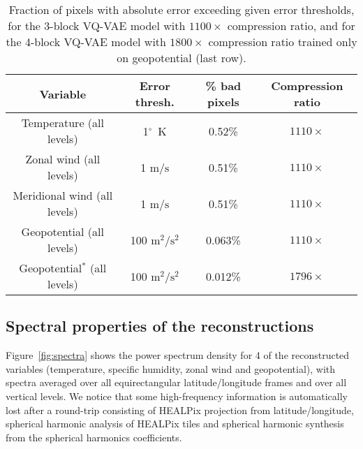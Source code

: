 \begin{table}[]
    \centering
    \caption{Fraction of pixels with absolute error exceeding given error thresholds, for the 3-block VQ-VAE model with $1100 \times$ compression ratio, and for the 4-block VQ-VAE model with $1800 \times$ compression ratio trained only on geopotential (last row).}
    \begin{tabular}{c|c|c|c}
        Variable & Error thresh. & \% bad pixels & Compression ratio \\
        \hline
        Temperature (all levels) & 1$^\circ$~K & 0.52\% & $1110 \times$ \\
        Zonal wind (all levels) & 1 $\text{m}/\text{s}$ & 0.51\% & $1110 \times$ \\
        Meridional wind (all levels) & 1 $\text{m}/\text{s}$ & 0.51\% & $1110 \times$ \\
        Geopotential (all levels) & 100 $\text{m}^2/\text{s}^2$ & 0.063\% & $1110 \times$ \\
        \hline
        Geopotential$^*$ (all levels) & 100 $\text{m}^2/\text{s}^2$ & 0.012\% & $1796 \times$ \\
    \end{tabular}
    
    \label{tab:percent_bad_cells_vqvae}
\end{table}


\subsection{Spectral properties of the reconstructions}

Figure~\ref{fig:spectra} shows the power spectrum density for 4 of the reconstructed variables (temperature, specific humidity, zonal wind and geopotential), with spectra averaged over all equirectangular latitude/longitude frames and over all vertical levels. We notice that some high-frequency information is automatically lost after a round-trip consisting of HEALPix projection from latitude/longitude, spherical harmonic analysis of HEALPix tiles and spherical harmonic synthesis from the spherical harmonics coefficients.

